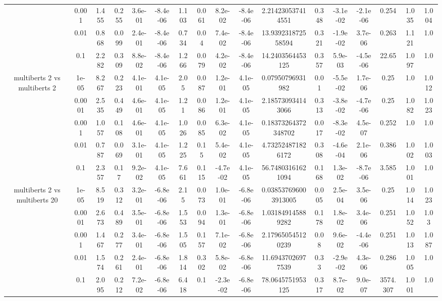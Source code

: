 \begin{tabular}{|c|c|c|c|c|c|c|c|c|c|c|c|c|c|c|c|c|}
 & 0.001 & 1.455 & 0.255 & 3.6e-01 & -8.4e-06 & 1.103 & 0.061 & 8.2e-02 & -8.4e-06 & 2.214230537414551 & 0.348 & -3.1e-02 & -2.1e-06 & 0.254 & 1.035 & 1.004 \\
 & 0.01 & 0.868 & 0.099 & 2.4e-01 & -8.4e-06 & 0.734 & 0.04 & 7.4e-02 & -8.4e-06 & 13.939231872558594 & 0.321 & -1.9e-02 & 3.7e-06 & 0.263 & 1.121 & 1.0 \\
 & 0.1 & 2.282 & 0.309 & 8.8e-02 & -8.4e-06 & 1.266 & 0.079 & 4.2e-02 & -8.4e-06 & 14.2403564453125 & 0.357 & 5.9e-03 & -4.5e-06 & 22.65 & 1.097 & 1.0 \\
\hline
\multirow{5}{*}{multiberts 2 vs multiberts 2} & 1e-05 & 8.267 & 0.223 & 4.1e-01 & 4.1e-05 & 2.05 & 0.087 & 1.2e-01 & 4.1e-05 & 0.07950796931982 & 0.01 & -5.5e-02 & 1.7e-06 & 0.25 & 1.0 & 1.012 \\
 & 0.0001 & 2.535 & 0.449 & 4.6e-01 & 4.1e-05 & 1.21 & 0.086 & 1.2e-01 & 4.1e-05 & 2.185730934143066 & 0.313 & -3.8e-02 & -4.7e-06 & 0.25 & 1.082 & 1.023 \\
 & 0.001 & 1.057 & 0.108 & 4.6e-01 & 4.1e-05 & 1.026 & 0.085 & 6.3e-02 & 4.1e-05 & 0.18373264372348702 & 0.017 & -8.3e-02 & 4.5e-07 & 0.252 & 1.0 & 1.0 \\
 & 0.01 & 0.787 & 0.069 & 3.1e-01 & 4.1e-05 & 1.225 & 0.15 & 5.4e-02 & 4.1e-05 & 4.732524871826172 & 0.308 & -4.6e-04 & 2.1e-06 & 0.386 & 1.002 & 1.003 \\
 & 0.1 & 2.357 & 0.17 & 9.2e-02 & 4.1e-05 & 7.661 & 0.115 & -4.7e-02 & 4.1e-05 & 56.74803161621094 & 0.168 & 1.3e-02 & -8.7e-06 & 3.585 & 1.001 & 1.0 \\
\hline
\multirow{5}{*}{multiberts 2 vs multiberts 20} & 1e-05 & 8.519 & 0.312 & 3.2e-01 & -6.8e-06 & 2.15 & 0.073 & 1.0e-01 & -6.8e-06 & 0.038537696003913005 & 0.005 & 2.5e-04 & 3.5e-06 & 0.25 & 1.014 & 1.023 \\
 & 0.0001 & 2.673 & 0.489 & 3.5e-01 & -6.8e-06 & 1.553 & 0.094 & 1.3e-01 & -6.8e-06 & 1.031849145889282 & 0.178 & 1.8e-02 & 3.4e-06 & 0.251 & 1.052 & 1.03 \\
 & 0.001 & 1.467 & 0.277 & 3.4e-01 & -6.8e-06 & 1.505 & 0.157 & 7.1e-02 & -6.8e-06 & 2.179650545120239 & 0.08 & 9.6e-02 & -4.4e-06 & 0.251 & 1.013 & 1.087 \\
 & 0.01 & 1.574 & 0.261 & 2.4e-01 & -6.8e-06 & 1.814 & 0.302 & 5.8e-02 & -6.8e-06 & 11.69437026977539 & 0.33 & -2.9e-02 & 4.3e-06 & 0.286 & 1.005 & 1.0 \\
 & 0.1 & 2.095 & 0.212 & 7.2e-02 & -6.8e-06 & 6.418 & 0.1 & -2.3e-02 & -6.8e-06 & 78.0645751953125 & 0.317 & 8.7e-02 & 9.0e-07 & 3574.307 & 1.001 & 1.0 \\

\end{tabular}
